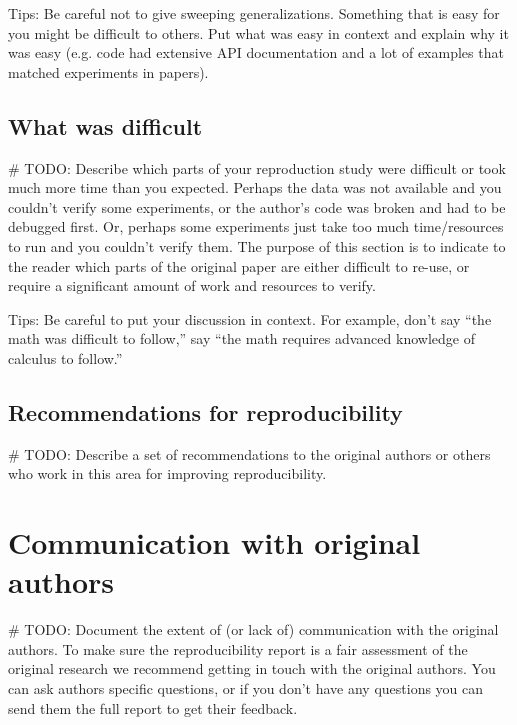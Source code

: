 \documentclass[11pt,a4paper]{article}
\begin{document}
Tips: Be careful not to give sweeping generalizations. Something that is easy for you might be difficult to others. Put what was easy in context and explain why it was easy (e.g. code had extensive API documentation and a lot of examples that matched experiments in papers). 

\subsection{What was difficult}
\# TODO:
Describe which parts of your reproduction study were difficult or took much more time than you expected. Perhaps the data was not available and you couldn't verify some experiments, or the author's code was broken and had to be debugged first. Or, perhaps some experiments just take too much time/resources to run and you couldn't verify them. The purpose of this section is to indicate to the reader which parts of the original paper are either difficult to re-use, or require a significant amount of work and resources to verify. 

Tips: Be careful to put your discussion in context. For example, don't say ``the math was difficult to follow,'' say ``the math requires advanced knowledge of calculus to follow.'' 

\subsection{Recommendations for reproducibility}
\# TODO:
Describe a set of recommendations to the original authors or others who work in this area for improving reproducibility.

\section{Communication with original authors}
\# TODO:
Document the extent of (or lack of) communication with the original authors. To make sure the reproducibility report is a fair assessment of the original research we recommend getting in touch with the original authors. You can ask authors specific questions, or if you don't have any questions you can send them the full report to get their feedback.





\end{document}
